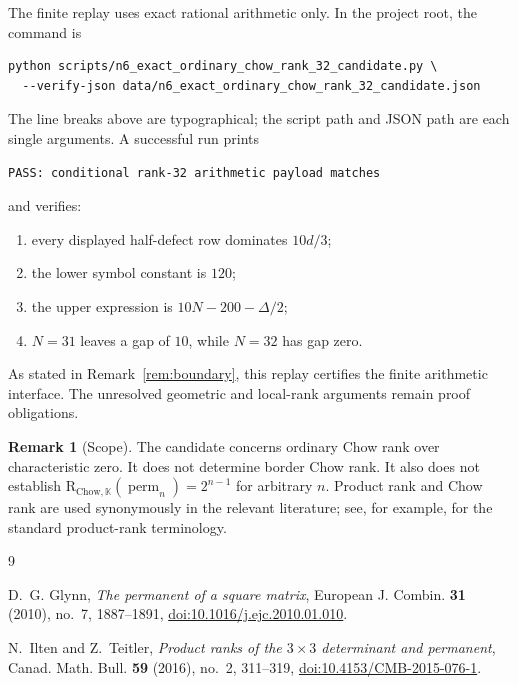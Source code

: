 \documentclass[11pt]{amsart}
\newcommand{\K}{\mathbb{K}}
\newcommand{\perm}{\operatorname{perm}}
\newcommand{\CR}{\mathrm{R}_{\mathrm{Chow},\K}}
\theoremstyle{definition}
\newtheorem{remark}[theorem]{Remark}
\begin{document}
The finite replay uses exact rational arithmetic only.  In the project root,
the command is
\begin{verbatim}
python scripts/n6_exact_ordinary_chow_rank_32_candidate.py \
  --verify-json data/n6_exact_ordinary_chow_rank_32_candidate.json
\end{verbatim}
The line breaks above are typographical; the script path and JSON path are
each single arguments.  A successful run prints
\begin{verbatim}
PASS: conditional rank-32 arithmetic payload matches
\end{verbatim}
and verifies:
\begin{enumerate}
 \item every displayed half-defect row dominates \(10d/3\);
 \item the lower symbol constant is \(120\);
 \item the upper expression is \(10N-200-\Delta/2\);
 \item \(N=31\) leaves a gap of \(10\), while \(N=32\) has gap zero.
\end{enumerate}
As stated in Remark~\ref{rem:boundary}, this replay certifies the finite
arithmetic interface.  The unresolved geometric and local-rank arguments
remain proof obligations.

\begin{remark}[Scope]
The candidate concerns ordinary Chow rank over characteristic zero.  It does
not determine border Chow rank.  It also does not establish
\(\CR(\perm_n)=2^{n-1}\) for arbitrary \(n\).  Product rank and Chow rank
are used synonymously in the relevant literature; see, for example,
\cite{IltenTeitler2016} for the standard product-rank terminology.
\end{remark}

\begin{thebibliography}{9}

D.~G. Glynn,
\emph{The permanent of a square matrix},
European J. Combin. \textbf{31} (2010), no.~7, 1887--1891,
\href{https://doi.org/10.1016/j.ejc.2010.01.010}
{doi:10.1016/j.ejc.2010.01.010}.

N.~Ilten and Z.~Teitler,
\emph{Product ranks of the \(3\times3\) determinant and permanent},
Canad. Math. Bull. \textbf{59} (2016), no.~2, 311--319,
\href{https://doi.org/10.4153/CMB-2015-076-1}
{doi:10.4153/CMB-2015-076-1}.

\end{thebibliography}
\end{document}

